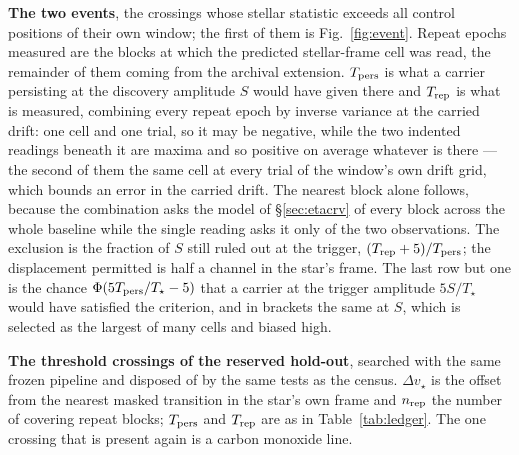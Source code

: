\begin{table}
\centering
\caption{\textbf{The two events}, the crossings whose
stellar statistic exceeds all \NCtrl{} control positions of their own window;
the first of them is Fig.~\ref{fig:event}.
Repeat epochs measured are the blocks at which the predicted stellar-frame
cell was read, the remainder of them coming from the archival extension.
$T_{\rm pers}$ is what a carrier persisting at the discovery amplitude $S$
would have given there and $T_{\rm rep}$ is what is measured, combining every
repeat epoch by inverse variance at the carried drift: one cell and one
trial, so it may be negative, while the two indented readings beneath it are
maxima and so positive on average whatever is there --- the second of them
the same cell at every trial of the window's own drift grid, which bounds an
error in the carried drift. The nearest block alone
follows, because the combination asks the model of \S\ref{sec:etacrv} of
every block across the whole baseline while the single reading asks it only
of the two observations. The exclusion is the fraction of $S$ still
ruled out at the trigger, $(T_{\rm rep}+5)/T_{\rm pers}$; the displacement
permitted is half a channel in the star's frame. The last row but one is the
chance $\Phi(5T_{\rm pers}/T_\star-5)$ that a carrier at the trigger
amplitude $5S/T_\star$ would have satisfied the criterion, and in brackets the
same at $S$, which is selected as the largest of many cells and biased high.}
\label{tab:cand}
\footnotesize

\end{table}

\begin{table}
\centering
\caption{\textbf{The threshold crossings of the reserved hold-out}, searched
with the same frozen pipeline and disposed of by the same tests as the
census. $\Delta v_\star$ is the offset from the nearest masked transition in
the star's own frame and $n_{\rm rep}$ the number of covering repeat blocks;
$T_{\rm pers}$ and $T_{\rm rep}$ are as in Table~\ref{tab:ledger}. The one
crossing that is present again is a carbon monoxide line.}
\label{tab:holdout}
\scriptsize

\end{table}




